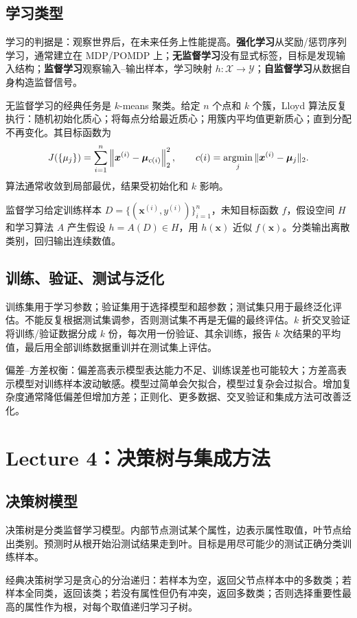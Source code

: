 \documentclass[UTF8,11pt,a4paper]{ctexart}
\begin{document}
\subsection{学习类型}
学习的判据是：观察世界后，在未来任务上性能提高。\textbf{强化学习}从奖励/惩罚序列学习，通常建立在 MDP/POMDP 上；\textbf{无监督学习}没有显式标签，目标是发现输入结构；\textbf{监督学习}观察输入--输出样本，学习映射 $h:\mathcal X\to\mathcal Y$；\textbf{自监督学习}从数据自身构造监督信号。

无监督学习的经典任务是 $k$-means 聚类。给定 $n$ 个点和 $k$ 个簇，Lloyd 算法反复执行：随机初始化质心；将每点分给最近质心；用簇内平均值更新质心；直到分配不再变化。其目标函数为
\[
J(\{\mu_j\})=\sum_{i=1}^{n}\left\|\bm{x}^{(i)}-\bm{\mu}_{c(i)}\right\|_2^2,
\qquad c(i)=\mathop{\mathrm{argmin}}_j\|\bm{x}^{(i)}-\bm\mu_j\|_2.
\]
算法通常收敛到局部最优，结果受初始化和 $k$ 影响。

监督学习给定训练样本 $D=\{(\bm{x}^{(i)},y^{(i)})\}_{i=1}^n$，未知目标函数 $f$，假设空间 $H$ 和学习算法 $A$ 产生假设 $h=A(D)\in H$，用 $h(\bm{x})$ 近似 $f(\bm{x})$。分类输出离散类别，回归输出连续数值。

\subsection{训练、验证、测试与泛化}
训练集用于学习参数；验证集用于选择模型和超参数；测试集只用于最终泛化评估。不能反复根据测试集调参，否则测试集不再是无偏的最终评估。$k$ 折交叉验证将训练/验证数据分成 $k$ 份，每次用一份验证、其余训练，报告 $k$ 次结果的平均值，最后用全部训练数据重训并在测试集上评估。

偏差--方差权衡：偏差高表示模型表达能力不足、训练误差也可能较大；方差高表示模型对训练样本波动敏感。模型过简单会欠拟合，模型过复杂会过拟合。增加复杂度通常降低偏差但增加方差；正则化、更多数据、交叉验证和集成方法可改善泛化。

\section{Lecture 4：决策树与集成方法}
\subsection{决策树模型}
决策树是分类监督学习模型。内部节点测试某个属性，边表示属性取值，叶节点给出类别。预测时从根开始沿测试结果走到叶。目标是用尽可能少的测试正确分类训练样本。

经典决策树学习是贪心的分治递归：若样本为空，返回父节点样本中的多数类；若样本全同类，返回该类；若没有属性但仍有冲突，返回多数类；否则选择重要性最高的属性作为根，对每个取值递归学习子树。
\end{document}
